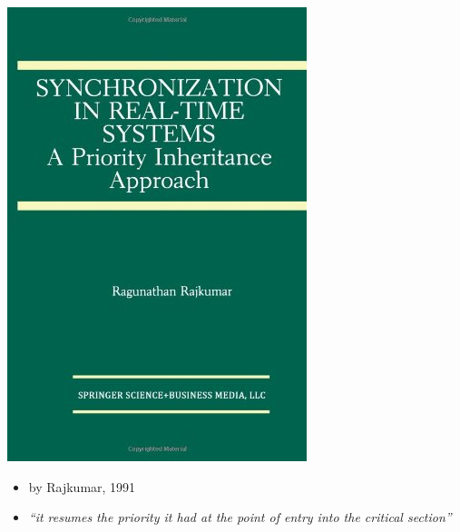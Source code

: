 \documentclass[dvipsnames,14pt,t]{beamer}
\begin{document}
  \begin{frame}[c]

  \begin{center}
  \includegraphics[scale=0.25]{pics/p3.jpg}
  \end{center}

   \begin{itemize}
  \item by Rajkumar, 1991
  \item \it ``it resumes the priority it had at the point of entry into the critical 
  section''
  \end{itemize}

  \end{frame}
     
\end{document}
